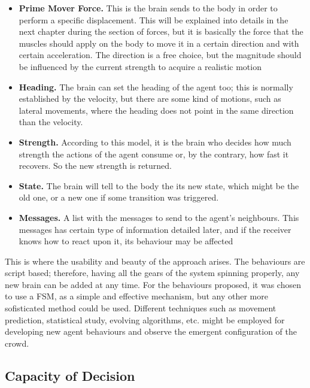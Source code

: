 \begin{itemize}

\item{{\bf Prime Mover Force.} This is the brain sends to the body in order to perform a specific displacement. This will be explained into details in the next chapter during the section of forces, but it is basically the force that the muscles should apply on the body to move it in a certain direction and with certain acceleration. The direction is a free choice, but the magnitude should be influenced by the current strength to acquire a realistic motion}

\item{{\bf Heading.} The brain can set the heading of the agent too; this is normally established by the velocity, but there are some kind of motions, such as lateral movements, where the heading does not point in the same direction than the velocity.}

\item{{\bf Strength.} According to this model, it is the brain who decides how much strength the actions of the agent consume or, by the contrary, how fast it recovers. So the new strength is returned.}

\item{{\bf State.} The brain will tell to the body the its new state, which might be the old one, or a new one if some transition was triggered.}

\item{{\bf Messages.} A list with the messages to send to the agent's neighbours. This messages has certain type of information detailed later, and if the receiver knows how to react upon it, its behaviour may be affected}

\end{itemize}

This is where the usability and beauty of the approach arises. The behaviours are script based; therefore, having all the gears of the system spinning properly, any new brain can be added at any time. For the behaviours proposed, it was chosen to use a FSM, as a simple and effective mechanism, but any other more sofisticated method could be used. Different techniques such as movement prediction, statistical study, evolving algorithms, etc. might be employed for developing new agent behaviours and observe the emergent configuration of the crowd.

\subsection{Capacity of Decision}

